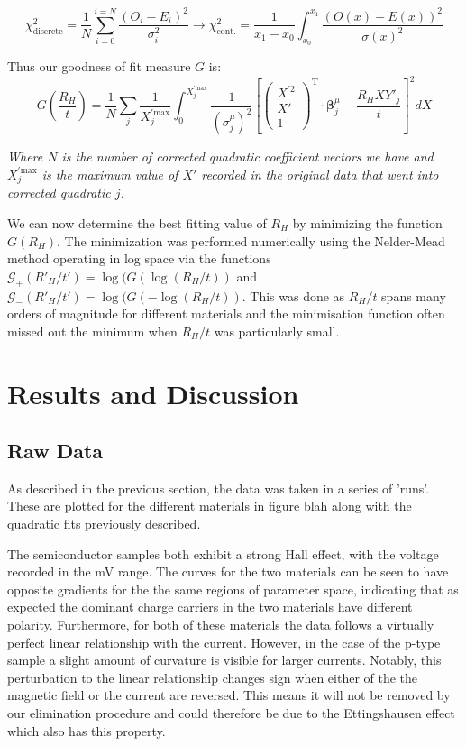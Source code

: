 \documentclass{article}
\begin{document}
		\begin{equation}
			\chi^2_{\textrm{discrete}} = \frac{1}{N}\sum_{i=0}^{i=N}\frac{(O_i-E_i)^2}{\sigma_i^2} \rightarrow \chi^2_{\textrm{cont.}} = \frac{1}{x_1-x_0}\int_{x_0}^{x_1}\frac{(O(x)-E(x))^2}{\sigma(x)^2}
		\end{equation}
		
		\noindent Thus our goodness of fit measure $G$ is:
		\begin{equation}
			G\left(\frac{R_H}{t}\right) = \frac{1}{N}\sum_j\frac{1}{X^{\prime \textrm{max}}_j}\int_{0}^{X^{\prime \textrm{max}}_j}\frac{1}{(\sigma^\mu_j)^2}\left[\begin{pmatrix}X^{\prime2} \\ X' \\ 1\end{pmatrix}^\mathrm{T}\cdot\boldsymbol{\beta}^\mu_j - \frac{R_HXY'_j}{t}\right]^2 dX
		\end{equation}
		\begin{center} \emph{Where $N$ is the number of corrected quadratic coefficient vectors we have and $X^{\prime \textrm{max}}_j$ is the maximum value of $X'$ recorded in the original data that went into corrected quadratic $j$.} \end{center}
		
		We can now determine the best fitting value of $R_H$ by minimizing the function $G(R_H)$. The minimization was performed numerically using the Nelder-Mead method operating in log space via the functions $\mathcal{G_+}(R'_H/t') = \log(G(\log(R_H/t))$ and $\mathcal{G_-}(R'_H/t') = \log(G(-\log(R_H/t))$. This was done as $R_H/t$ spans many orders of magnitude for different materials and the minimisation function often missed out the minimum when $R_H/t$ was particularly small.
	
	\section{Results and Discussion}
		\subsection{Raw Data}
			As described in the previous section, the data was taken in a series of 'runs'. These are plotted for the different materials in figure blah along with the quadratic fits previously described.
			
			The semiconductor samples both exhibit a strong Hall effect, with the voltage recorded in the mV range. The curves for the two materials can be seen to have opposite gradients for the the same regions of parameter space, indicating that as expected the dominant charge carriers in the two materials have different polarity. Furthermore, for both of these materials the data follows a virtually perfect linear relationship with the current. However, in the case of the p-type sample a slight amount of curvature is visible for larger currents. Notably, this perturbation to the linear relationship changes sign when either of the the magnetic field or the current are reversed. This means it will not be removed by our elimination procedure and could therefore be due to the Ettingshausen effect which also has this property.
			
\end{document}
